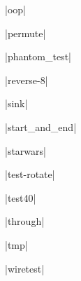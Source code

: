 \documentclass{article}
\begin{document}
|oop|
\begin{figure}[ht]
\caption{\protect{}}

\end{figure}

|permute|
\begin{figure}[ht]
\caption{\protect{}}

\end{figure}

|phantom_test|
\begin{figure}[ht]
\caption{\protect{}}

\end{figure}
\clearpage

|reverse-8|
\begin{figure}[ht]
\caption{\protect{}}

\end{figure}

|sink|
\begin{figure}[ht]
\caption{\protect{}}

\end{figure}

|start_and_end|
\begin{figure}[ht]
\caption{\protect{}}

\end{figure}

|starwars|
\begin{figure}[ht]
\caption{\protect{}}

\end{figure}

|test-rotate|
\begin{figure}[ht]
\caption{\protect{}}

\end{figure}

|test40|
\begin{figure}[ht]
\caption{\protect{}}

\end{figure}

|through|
\begin{figure}[ht]
\caption{\protect{}}

\end{figure}

|tmp|
\begin{figure}[ht]
\caption{\protect{}}

\end{figure}

|wiretest|
\begin{figure}[ht]
\caption{\protect{}}

\end{figure}
\clearpage
\end{document}
